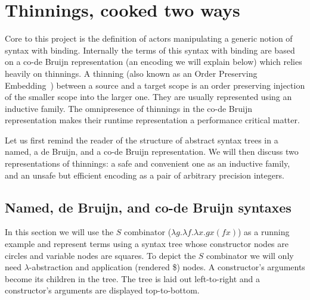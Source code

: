 \section{Thinnings, cooked two ways}\label{sec:codebruijn}

\iftoggle{BLIND}
{In their work on \typos~\cite{MANUAL:talk/types/Allais22}, a domain specific language
to define concurrent typecheckers and elaborators, the authors go out of their way
to avoid using inductive families because of their inefficient runtime representation.
}
{We experienced a major limitation of compilation of inductive families
during our ongoing development of
\typos~\cite{MANUAL:talk/types/Allais22}, a domain specific language
to define concurrent typecheckers and elaborators.
}
%
Core to this project is the definition of actors manipulating a generic notion
of syntax with binding.
%
Internally the terms of this syntax with binding are based on a co-de Bruijn
representation (an encoding we will explain below) which relies heavily on
thinnings.
%
A thinning (also known as an Order Preserving
Embedding~\cite{MANUAL:phd/nott/Chapman09})
between a source and a target scope is an order preserving injection
of the smaller scope into the larger one.
%
They are usually represented using an inductive family.
%
The omnipresence of thinnings in the co-de Bruijn representation makes their
runtime representation a performance critical matter.

Let us first remind the reader of the structure of abstract syntax trees in a
named, a de Bruijn, and a co-de Bruijn representation. We will then discuss two
representations of thinnings: a safe and convenient one as an inductive family,
and an unsafe but efficient encoding as a pair of arbitrary precision integers.

\subsection{Named, de Bruijn, and co-de Bruijn syntaxes}

In this section we will use
the $S$ combinator ($\lambda g. \lambda f. \lambda x. g x (f x)$)
as a running example and represent
terms using a syntax tree whose constructor nodes are circles and variable nodes
are squares.
%
To depict the $S$ combinator we will only need $\lambda{}$-abstraction and
application (rendered \$) nodes. A constructor's arguments become its children
in the tree.
%
The tree is laid out left-to-right and a constructor's arguments are displayed
top-to-bottom.

